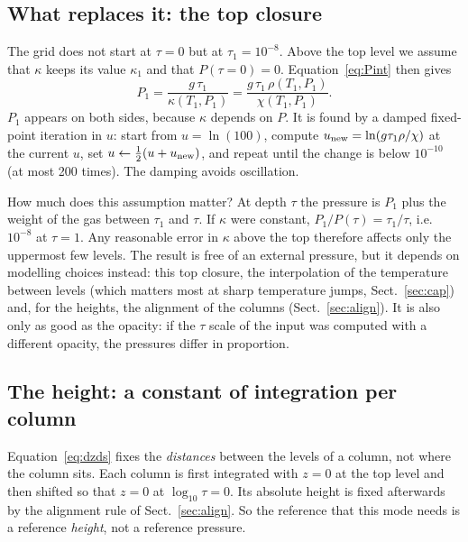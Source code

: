 \subsection{What replaces it: the top closure}
The grid does not start at $\tau=0$ but at $\tau_1=10^{-8}$. Above the top level we assume that $\kappa$ keeps its value
$\kappa_1$ and that $P(\tau=0)=0$. Equation~\eqref{eq:Pint} then gives
\begin{equation}
P_1=\frac{g\,\tau_1}{\kappa(T_1,P_1)}=\frac{g\,\tau_1\,\rho(T_1,P_1)}{\chi(T_1,P_1)} .\label{eq:top}
\end{equation}
$P_1$ appears on both sides, because $\kappa$ depends on $P$. It is found by a damped fixed-point iteration in $u$: start
from $u=\ln(100)$, compute $u_{\rm new}=\ln(g\tau_1\rho/\chi)$ at the current $u$, set $u\leftarrow\tfrac12(u+u_{\rm new})$,
and repeat until the change is below $10^{-10}$ (at most 200 times). The damping avoids oscillation.

How much does this assumption matter? At depth $\tau$ the pressure is $P_1$ plus the weight of the gas between $\tau_1$ and
$\tau$. If $\kappa$ were constant, $P_1/P(\tau)=\tau_1/\tau$, i.e.\ $10^{-8}$ at $\tau=1$. Any reasonable error in $\kappa$
above the top therefore affects only the uppermost few levels. The result is free of an external pressure, but it depends
on modelling choices instead: this top closure, the interpolation of the temperature between levels (which matters most
at sharp temperature jumps, Sect.~\ref{sec:cap}) and, for the heights, the alignment of the columns
(Sect.~\ref{sec:align}). It is also only as good as the opacity: if the
$\tau$ scale of the input was computed with a different opacity, the pressures differ in proportion.

\subsection{The height: a constant of integration per column}
Equation~\eqref{eq:dzds} fixes the \emph{distances} between the levels of a column, not where the column sits. Each column
is first integrated with $z=0$ at the top level and then shifted so that $z=0$ at $\log_{10}\tau=0$. Its absolute height is
fixed afterwards by the alignment rule of Sect.~\ref{sec:align}. So the reference that this mode needs is a reference
\emph{height}, not a reference pressure.

